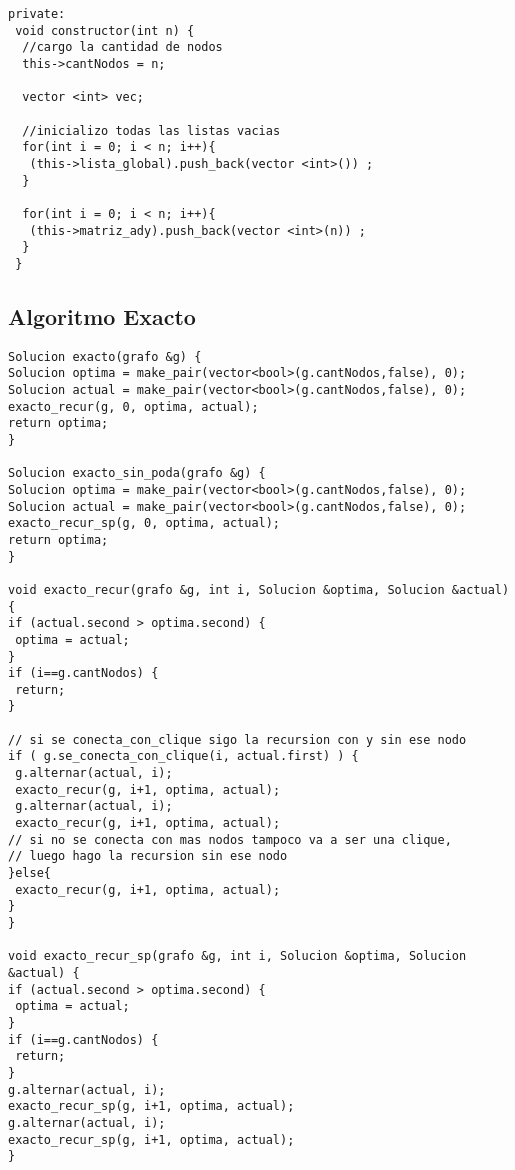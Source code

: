 \begin{lstlisting}
private:
 void constructor(int n) {
  //cargo la cantidad de nodos
  this->cantNodos = n;

  vector <int> vec;

  //inicializo todas las listas vacias
  for(int i = 0; i < n; i++){
   (this->lista_global).push_back(vector <int>()) ;
  }

  for(int i = 0; i < n; i++){
   (this->matriz_ady).push_back(vector <int>(n)) ;
  }
 }
\end{lstlisting}
\newpage
\subsection{Algoritmo Exacto}

\begin{lstlisting}
Solucion exacto(grafo &g) {
Solucion optima = make_pair(vector<bool>(g.cantNodos,false), 0);
Solucion actual = make_pair(vector<bool>(g.cantNodos,false), 0);
exacto_recur(g, 0, optima, actual);
return optima;
}

Solucion exacto_sin_poda(grafo &g) {
Solucion optima = make_pair(vector<bool>(g.cantNodos,false), 0);
Solucion actual = make_pair(vector<bool>(g.cantNodos,false), 0);
exacto_recur_sp(g, 0, optima, actual);
return optima;
}

void exacto_recur(grafo &g, int i, Solucion &optima, Solucion &actual) {
if (actual.second > optima.second) {
 optima = actual;
}
if (i==g.cantNodos) {
 return;
}

// si se conecta_con_clique sigo la recursion con y sin ese nodo
if ( g.se_conecta_con_clique(i, actual.first) ) {
 g.alternar(actual, i);
 exacto_recur(g, i+1, optima, actual);
 g.alternar(actual, i);
 exacto_recur(g, i+1, optima, actual);
// si no se conecta con mas nodos tampoco va a ser una clique,
// luego hago la recursion sin ese nodo
}else{
 exacto_recur(g, i+1, optima, actual);
}
}

void exacto_recur_sp(grafo &g, int i, Solucion &optima, Solucion &actual) {
if (actual.second > optima.second) {
 optima = actual;
}
if (i==g.cantNodos) {
 return;
}
g.alternar(actual, i);
exacto_recur_sp(g, i+1, optima, actual);
g.alternar(actual, i);
exacto_recur_sp(g, i+1, optima, actual);
}
\end{lstlisting}

\newpage
